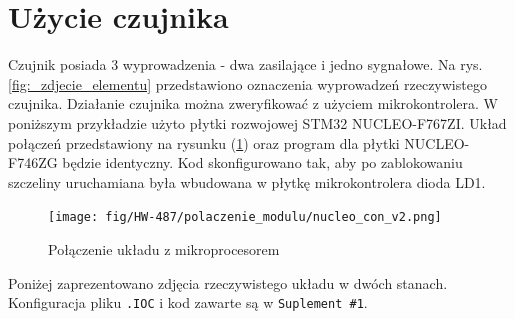 \documentclass[11pt, a4paper]{article}
\begin{document}
\newpage

\section{Użycie czujnika}
Czujnik posiada 3 wyprowadzenia - dwa zasilające i jedno sygnałowe. Na rys. \ref{fig:_zdjecie_elementu} przedstawiono oznaczenia wyprowadzeń rzeczywistego czujnika. Działanie czujnika można zweryfikować z użyciem mikrokontrolera. W poniższym przykładzie użyto płytki rozwojowej STM32 NUCLEO-F767ZI. Układ połączeń przedstawiony na rysunku (\ref{fig:_polaczenie_ukladu}) oraz program dla płytki NUCLEO-F746ZG będzie identyczny. Kod skonfigurowano tak, aby po zablokowaniu szczeliny uruchamiana była wbudowana w płytkę mikrokontrolera dioda LD1.

\vspace{0.25cm}
\begin{figure}[h]
    \centering
    \texttt{[image: fig/HW-487/polaczenie\_modulu/nucleo\_con\_v2.png]}
    \caption{Połączenie układu z mikroprocesorem}
    \label{fig:_polaczenie_ukladu}
\end{figure}
\vspace{0.25cm}

Poniżej zaprezentowano zdjęcia rzeczywistego układu w dwóch stanach. Konfiguracja pliku \texttt{.IOC} i kod zawarte są w \texttt{Suplement \#1}.
\end{document}
